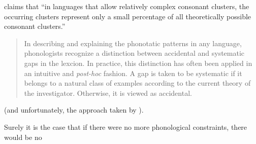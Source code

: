 \citet[94]{Hooper1973} claims that ``in languages that allow relatively complex consonant clusters, the occurring clusters represent only a small percentage of all theoretically possible consonant clusters.'' 

\begin{quotation}
In describing and explaining the phonotatic patterns in any language, phonologists recognize a distinction between accidental and systematic gaps in the lexcion. In practice, this distinction has often been applied in an intuitive and \emph{post-hoc} fashion. A gap is taken to be systematic if it belongs to a natural class of examples according to the current theory of the investigator. Otherwise, it is viewed as accidental. \citep[][180]{Frisch2004}
\end{quotation}

(and unfortunately, the approach taken by \citeauthor{Frisch2004}).

Surely it is the case that if there were no more phonological constraints, there would be no
